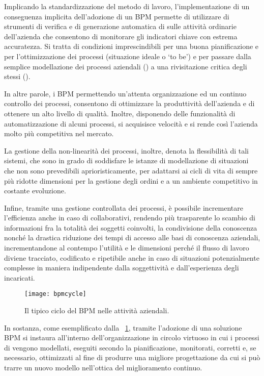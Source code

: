Implicando la standardizzazione del metodo di lavoro, l'implementazione di un  conseguenza implicita dell'adozione di un BPM permette di utilizzare di strumenti di verifica e di generazione automatica di  sulle attività ordinarie dell'azienda che consentono di monitorare gli indicatori chiave con estrema accuratezza. Si tratta di condizioni imprescindibili per una buona pianificazione e per l'ottimizzazione dei processi (situazione ideale o `to be') e per passare dalla semplice modellazione dei processi aziendali (\bsn {}) a una rivisitazione critica degli stessi (\bsn {}).

In altre parole, i \sw BPM permettendo un'attenta organizzazione ed un continuo controllo dei processi, consentono di ottimizzare la produttività dell'azienda e di ottenere un alto livello di qualità. Inoltre, disponendo delle funzionalità di automatizzazione di alcuni processi, si acquisisce velocità e si rende così l'azienda molto più competitiva nel mercato.

La gestione della non-linearità dei processi, inoltre, denota la flessibilità di tali sistemi, che sono in grado di soddisfare le istanze di modellazione di situazioni che non sono prevedibili aprioristicamente, per adattarsi ai cicli di vita di sempre più ridotte dimensioni per la gestione degli ordini e a un ambiente competitivo in costante evoluzione.

Infine, tramite una gestione controllata dei processi, è possibile incrementare l'efficienza anche in caso di  collaborativi, rendendo più trasparente lo scambio di informazioni fra la totalità dei soggetti coinvolti, la condivisione della conoscenza nonché la drastica riduzione dei tempi di accesso alle basi di conoscenza aziendali, incrementandone al contempo l'utilità e le dimensioni perché il flusso di lavoro diviene tracciato, codificato e ripetibile anche in caso di situazioni potenzialmente complesse in maniera indipendente dalla soggettività e dall'esperienza degli incaricati.

\begin{figure}[H]
  \centering
  \texttt{[image: bpmcycle]}
  \caption{Il tipico ciclo del BPM nelle attività aziendali.}
  \label{fig:bpmcycle}
\end{figure}

In sostanza, come esemplificato dalla \figurename~\ref{fig:bpmcycle}, tramite l'adozione di una soluzione BPM si instaura all'interno dell'organizzazione in circolo virtuoso in cui i processi di \bsn vengono modellati, eseguiti secondo la pianificazione, monitorati, corretti e, se necessario, ottimizzati al fine di produrre una migliore progettazione da cui si può trarre un nuovo modello nell'ottica del miglioramento continuo.

